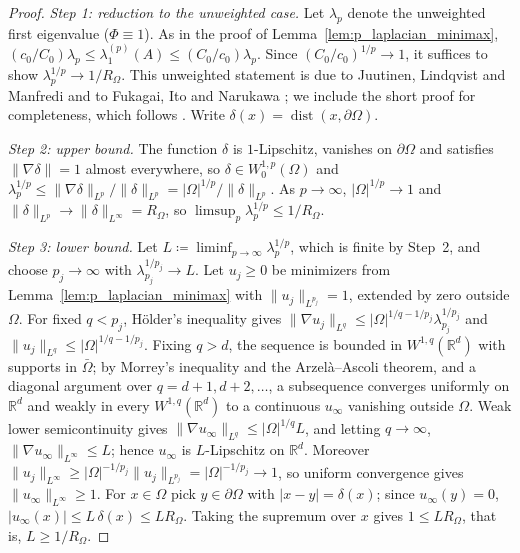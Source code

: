 \documentclass[11pt,a4paper,reqno]{amsart}
\theoremstyle{definition}
\theoremstyle{remark}
\numberwithin{equation}{section}
\begin{document}
\begin{proof}
\emph{Step 1: reduction to the unweighted case.} Let $\lambda_p$ denote the unweighted first eigenvalue ($\Phi \equiv 1$). As in the proof of Lemma~\ref{lem:p_laplacian_minimax}, $(c_0/C_0)\lambda_p \le \lambda_1^{(p)}(A) \le (C_0/c_0)\lambda_p$. Since $(C_0/c_0)^{1/p} \to 1$, it suffices to show $\lambda_p^{1/p} \to 1/R_\Omega$. This unweighted statement is due to Juutinen, Lindqvist and Manfredi \cite{JuutinenLindqvistManfredi1999} and to Fukagai, Ito and Narukawa \cite{FukagaiItoNarukawa1999}; we include the short proof for completeness, which follows \cite[Lemma~11]{Lindqvist2008}. Write $\delta(x) = \operatorname{dist}(x, \partial\Omega)$.

\emph{Step 2: upper bound.} The function $\delta$ is $1$-Lipschitz, vanishes on $\partial\Omega$ and satisfies $\|\nabla\delta\| = 1$ almost everywhere, so $\delta \in W_0^{1,p}(\Omega)$ and $\lambda_p^{1/p} \le \|\nabla\delta\|_{L^p}/\|\delta\|_{L^p} = |\Omega|^{1/p}/\|\delta\|_{L^p}$. As $p \to \infty$, $|\Omega|^{1/p} \to 1$ and $\|\delta\|_{L^p} \to \|\delta\|_{L^\infty} = R_\Omega$, so $\limsup_{p} \lambda_p^{1/p} \le 1/R_\Omega$.

\emph{Step 3: lower bound.} Let $L \coloneqq \liminf_{p\to\infty}\lambda_p^{1/p}$, which is finite by Step~2, and choose $p_j \to \infty$ with $\lambda_{p_j}^{1/p_j} \to L$. Let $u_j \ge 0$ be minimizers from Lemma~\ref{lem:p_laplacian_minimax} with $\|u_j\|_{L^{p_j}} = 1$, extended by zero outside $\Omega$. For fixed $q < p_j$, Hölder's inequality gives $\|\nabla u_j\|_{L^q} \le |\Omega|^{1/q - 1/p_j}\lambda_{p_j}^{1/p_j}$ and $\|u_j\|_{L^q} \le |\Omega|^{1/q-1/p_j}$. Fixing $q > d$, the sequence is bounded in $W^{1,q}(\mathbb{R}^d)$ with supports in $\bar\Omega$; by Morrey's inequality and the Arzelà--Ascoli theorem, and a diagonal argument over $q = d+1, d+2, \dots$, a subsequence converges uniformly on $\mathbb{R}^d$ and weakly in every $W^{1,q}(\mathbb{R}^d)$ to a continuous $u_\infty$ vanishing outside $\Omega$. Weak lower semicontinuity gives $\|\nabla u_\infty\|_{L^q} \le |\Omega|^{1/q} L$, and letting $q \to \infty$, $\|\nabla u_\infty\|_{L^\infty} \le L$; hence $u_\infty$ is $L$-Lipschitz on $\mathbb{R}^d$. Moreover $\|u_j\|_{L^\infty} \ge |\Omega|^{-1/p_j}\|u_j\|_{L^{p_j}} = |\Omega|^{-1/p_j} \to 1$, so uniform convergence gives $\|u_\infty\|_{L^\infty} \ge 1$. For $x \in \Omega$ pick $y \in \partial\Omega$ with $|x - y| = \delta(x)$; since $u_\infty(y) = 0$, $|u_\infty(x)| \le L\,\delta(x) \le L R_\Omega$. Taking the supremum over $x$ gives $1 \le L R_\Omega$, that is, $L \ge 1/R_\Omega$.
\end{proof}
\end{document}
